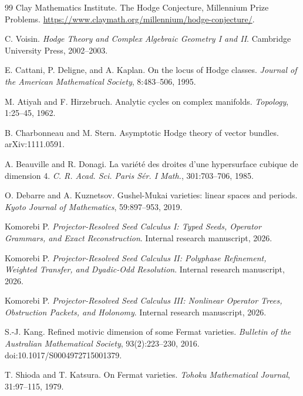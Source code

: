 {\small
\begin{thebibliography}{99}
\setlength{\itemsep}{0.18em}
Clay Mathematics Institute.
\newblock The Hodge Conjecture, Millennium Prize Problems.
\newblock \url{https://www.claymath.org/millennium/hodge-conjecture/}.

C. Voisin.
\newblock \emph{Hodge Theory and Complex Algebraic Geometry I and II}.
\newblock Cambridge University Press, 2002--2003.

E. Cattani, P. Deligne, and A. Kaplan.
\newblock On the locus of Hodge classes.
\newblock \emph{Journal of the American Mathematical Society}, 8:483--506, 1995.

M. Atiyah and F. Hirzebruch.
\newblock Analytic cycles on complex manifolds.
\newblock \emph{Topology}, 1:25--45, 1962.

B. Charbonneau and M. Stern.
\newblock Asymptotic Hodge theory of vector bundles.
\newblock arXiv:1111.0591.

A. Beauville and R. Donagi.
\newblock La vari\'et\'e des droites d'une hypersurface cubique de dimension 4.
\newblock \emph{C. R. Acad. Sci. Paris S\'er. I Math.}, 301:703--706, 1985.

O. Debarre and A. Kuznetsov.
\newblock Gushel-Mukai varieties: linear spaces and periods.
\newblock \emph{Kyoto Journal of Mathematics}, 59:897--953, 2019.

Komorebi P.
\newblock \emph{Projector-Resolved Seed Calculus I: Typed Seeds, Operator Grammars, and Exact Reconstruction}.
\newblock Internal research manuscript, 2026.

Komorebi P.
\newblock \emph{Projector-Resolved Seed Calculus II: Polyphase Refinement, Weighted Transfer, and Dyadic-Odd Resolution}.
\newblock Internal research manuscript, 2026.

Komorebi P.
\newblock \emph{Projector-Resolved Seed Calculus III: Nonlinear Operator Trees, Obstruction Packets, and Holonomy}.
\newblock Internal research manuscript, 2026.

S.-J. Kang.
\newblock Refined motivic dimension of some Fermat varieties.
\newblock \emph{Bulletin of the Australian Mathematical Society}, 93(2):223--230, 2016.
\newblock doi:10.1017/S0004972715001379.

T. Shioda and T. Katsura.
\newblock On Fermat varieties.
\newblock \emph{Tohoku Mathematical Journal}, 31:97--115, 1979.


\end{thebibliography}}
